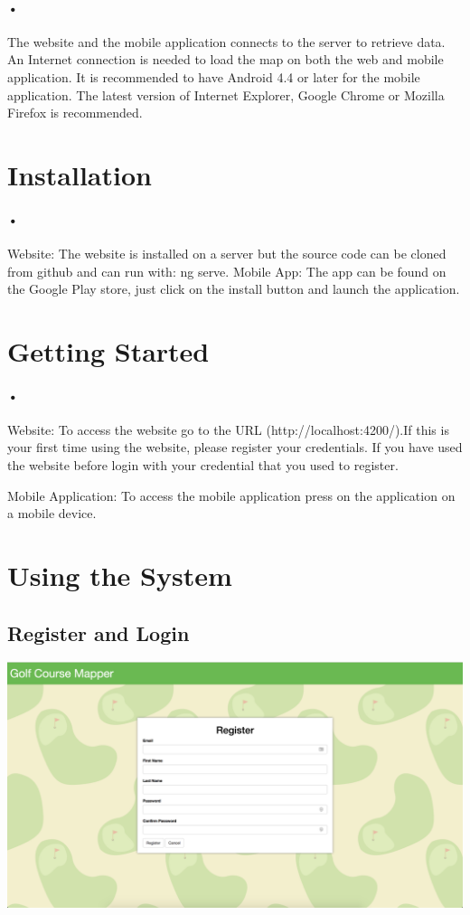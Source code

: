 \documentclass{article}
\begin{document}
	\paragraph{•}
	  The website and the mobile application connects to the server to retrieve data. An Internet connection is needed to load the map on both the web and mobile application. It is recommended to have Android 4.4 or later for the mobile application. The latest version of Internet Explorer, Google Chrome or Mozilla Firefox is recommended.
	  
	  \section{Installation}
	
	  \paragraph{•}
	  Website: The website is installed on a server but the source code can be cloned from github and can run with: ng serve.
	  Mobile App: The app can be found on the Google Play store, just click on the install button and launch the application.
	
	\section{Getting Started}
	\paragraph{•}
	
	Website: To access the website go to the URL (http://localhost:4200/).If this is your first time using the website, please register your credentials. If you have used the website before login with your credential that you used to register. 
	
	Mobile Application: To access the mobile application press on the application on a mobile device.
	\section{Using the System}
	
	\subsection{Register and Login}
	\includegraphics[scale=0.25]{Register}
\end{document}
